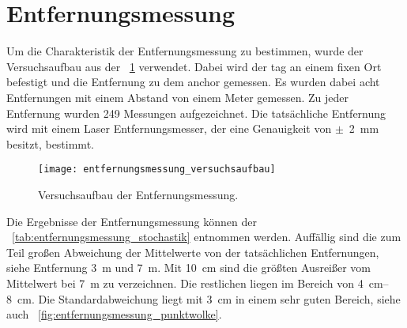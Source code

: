 \section{Entfernungsmessung}

Um die Charakteristik der Entfernungsmessung zu bestimmen, wurde der Versuchsaufbau aus der \figurename~\ref{fig:entfernungsmessung_versuchsaufbau} verwendet. Dabei wird der \Gls{tag} an einem fixen Ort befestigt und die Entfernung zu dem \Gls{anchor} gemessen. Es wurden dabei acht Entfernungen mit einem Abstand von einem Meter gemessen. Zu jeder Entfernung wurden \num{249} Messungen aufgezeichnet. Die tatsächliche Entfernung wird mit einem Laser Entfernungsmesser, der eine Genauigkeit von $\pm$~\SI{2}{\milli\meter} besitzt, bestimmt.

\begin{figure}[ht!]
  \centering
  \texttt{[image: entfernungsmessung\_versuchsaufbau]}
	\caption{Versuchsaufbau der Entfernungsmessung.}
	\label{fig:entfernungsmessung_versuchsaufbau}
\end{figure}

Die Ergebnisse der Entfernungsmessung können der \tablename~\ref{tab:entfernungsmessung_stochastik} entnommen werden. Auffällig sind die zum Teil großen Abweichung der Mittelwerte von der tatsächlichen Entfernungen, siehe Entfernung \SI{3}{\meter} und \SI{7}{\meter}. Mit \SI{10}{\centi\meter} sind die größten Ausreißer vom Mittelwert bei \SI{7}{\meter} zu verzeichnen. Die restlichen liegen im Bereich von \SIrange{4}{8}{\centi\meter}. Die Standardabweichung liegt mit \SI{3}{\centi\meter} in einem sehr guten Bereich, siehe auch \figurename~\ref{fig:entfernungsmessung_punktwolke}.

